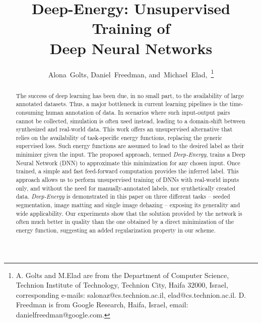 \documentclass[journal]{IEEEtran}
\begin{document}
\title{Deep-Energy: Unsupervised Training of \\Deep Neural Networks\\
}

\author{Alona~Golts,
        Daniel~Freedman,
        and~Michael~Elad,~\thanks{A. Golts and M.Elad are from the Department
of Computer Science, Technion Institute of Technology, Technion City, Haifa 32000, Israel,
corresponding e-mails: salonaz@cs.technion.ac.il, elad@cs.technion.ac.il.
D. Freedman is from Google Research, Haifa, Israel, email: danielfreedman@google.com.}}





\maketitle

\begin{abstract}
The success of deep learning has been due, in no small part, to the availability of large annotated datasets. Thus, a major bottleneck in current learning pipelines is the time-consuming human annotation of data. In scenarios where such input-output pairs cannot be collected, simulation is often used instead, leading to a domain-shift between synthesized and real-world data. This work offers an unsupervised alternative that relies on the availability of task-specific energy functions, replacing the generic supervised loss. Such energy functions are assumed to lead to the desired label as their minimizer given the input. The proposed approach, termed \emph{Deep-Energy}, trains a Deep Neural Network (DNN) to approximate this minimization for any chosen input. Once trained, a simple and fast feed-forward computation provides the inferred label. This approach allows us to perform unsupervised training of DNNs with real-world inputs only, and without the need for manually-annotated labels, nor synthetically created data. \emph{Deep-Energy} is demonstrated in this paper on three different tasks -- seeded segmentation, image matting and single image dehazing -- exposing its generality and wide applicability. Our experiments show that the solution provided by the network is often much better in quality than the one obtained by a direct minimization of the energy function, suggesting an added regularization property in our scheme.
\end{abstract}
\end{document}
